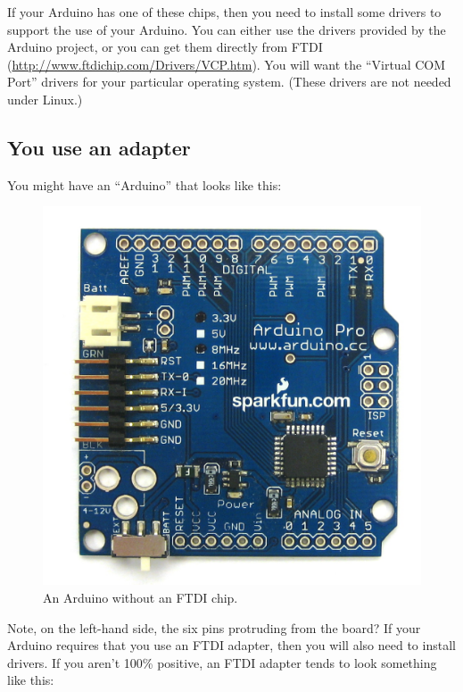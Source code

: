 If your Arduino has one of these chips, then you need to install some drivers to support the use of your Arduino. You can either use the drivers provided by the Arduino project, or you can get them directly from FTDI (\url{http://www.ftdichip.com/Drivers/VCP.htm}). You will want the ``Virtual COM Port'' drivers for your particular operating system. (These drivers are not needed under Linux.)

\subsection{You use an adapter}
You might have an ``Arduino'' that looks like this:

\begin{figure}[!ht]
  \begin{center}
    \includegraphics[width=0.8\linewidth]{images/20110115-arduino-pro-print}
    \caption{An Arduino without an FTDI chip.}
    \label{image:no-ftdi-arduino}
  \end{center}
\end{figure}

Note, on the left-hand side, the six pins protruding from the board? If your Arduino requires that you use an FTDI adapter, then you will also need to install drivers. If you aren't 100\% positive, an FTDI adapter tends to look something like this:

